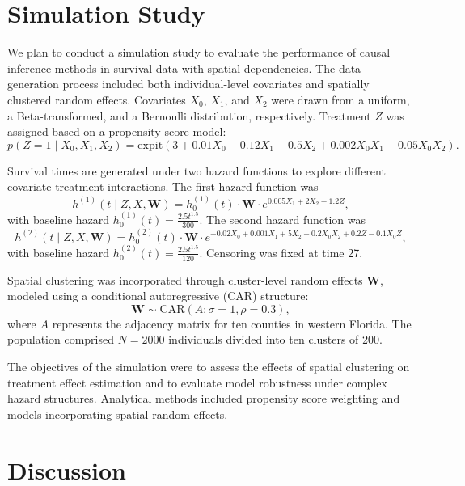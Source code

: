 \documentclass[useAMS,referee]{biom}
\begin{document}
\section{Simulation Study}

We plan to conduct a simulation study to evaluate the performance of causal inference methods in survival data with spatial dependencies. The data generation process included both individual-level covariates and spatially clustered random effects. Covariates \(X_0\), \(X_1\), and \(X_2\) were drawn from a uniform, a Beta-transformed, and a Bernoulli distribution, respectively. Treatment \(Z\) was assigned based on a propensity score model:
\[
p(Z = 1 \mid X_0, X_1, X_2) = \text{expit}(3 + 0.01 X_0 - 0.12 X_1 - 0.5 X_2 + 0.002 X_0 X_1 + 0.05 X_0 X_2).
\]

Survival times are generated under two hazard functions to explore different covariate-treatment interactions. The first hazard function was
\[
h^{(1)}(t \mid Z, X, \bm{W}) = h_0^{(1)}(t) \cdot \bm{W} \cdot e^{0.005 X_1 + 2 X_2 - 1.2 Z},
\]
with baseline hazard \(h_0^{(1)}(t) = \frac{2.5 t^{1.5}}{300}\). The second hazard function was
\[
h^{(2)}(t \mid Z, X, \bm{W}) = h_0^{(2)}(t) \cdot \bm{W} \cdot e^{-0.02 X_0 + 0.001 X_1 + 5 X_2 - 0.2 X_0 X_2 + 0.2 Z - 0.1 X_0 Z},
\]
with baseline hazard \(h_0^{(2)}(t) = \frac{2.5 t^{1.5}}{120}\). Censoring was fixed at time 27.

Spatial clustering was incorporated through cluster-level random effects \(\bm{W}\), modeled using a conditional autoregressive (CAR) structure:
\[
\bm{W} \sim \text{CAR}(A; \sigma = 1, \rho = 0.3),
\]
where \(A\) represents the adjacency matrix for ten counties in western Florida. The population comprised \(N = 2000\) individuals divided into ten clusters of 200.

The objectives of the simulation were to assess the effects of spatial clustering on treatment effect estimation and to evaluate model robustness under complex hazard structures. Analytical methods included propensity score weighting and models incorporating spatial random effects.






\section{Discussion}
\end{document}
